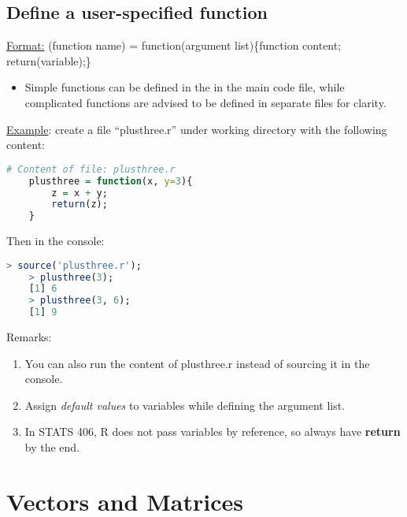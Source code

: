 \documentclass[10pt]{article}
\begin{document}
\subsection{Define a user-specified function}
\underline{Format:} (function name) = function(argument list)\{function content; return(variable);\}
\begin{itemize}
	\item Simple functions can be defined in the in the main code file, while complicated functions are advised to be defined in separate files for clarity.
\end{itemize}
\underline{Example}: create a file ``plusthree.r'' under working directory with the following content:
\begin{lstlisting}[style=displaycode, language=R]
	# Content of file: plusthree.r
	plusthree = function(x, y=3){
		z = x + y;
		return(z);
	}
\end{lstlisting}
Then in the console:
\begin{lstlisting}[style=displaycode, language=R]
	> source('plusthree.r');
	> plusthree(3);
	[1] 6
	> plusthree(3, 6);
	[1] 9
\end{lstlisting}
Remarks:
\begin{enumerate}
	\item You can also run the content of plusthree.r instead of sourcing it in the console.
	\item Assign \emph{default values} to variables while defining the argument list.
	\item In STATS 406, R does not pass variables by reference, so always have {\bf return} by the end.
\end{enumerate}

\section{Vectors and Matrices}
\end{document}
